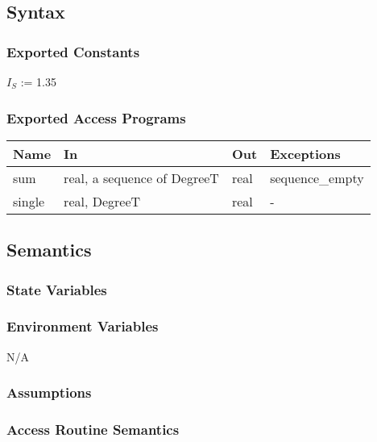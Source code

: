 \documentclass[12pt, titlepage]{article}
\begin{document}
\subsection{Syntax}

\subsubsection{Exported Constants}
$I_{S}$ := 1.35\\

\subsubsection{Exported Access Programs}

\begin{center}
\begin{tabular}{p{2cm} p{5cm} p{3cm} p{2cm}}
\hline
\textbf{Name} & \textbf{In} & \textbf{Out} & \textbf{Exceptions} \\
\hline 
sum & real, a sequence of DegreeT & real & sequence\_empty \\
single & real, DegreeT & real & - \\

\hline
\end{tabular}
\end{center}


\subsection{Semantics}

\subsubsection{State Variables}


\subsubsection{Environment Variables}

N/A

\subsubsection{Assumptions}

\subsubsection{ Access Routine Semantics}
\end{document}
